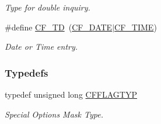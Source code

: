 \begin{DoxyCompactItemize}
\begin{DoxyCompactList}\small\item\em Type for double inquiry. \end{DoxyCompactList}\item 
\hypertarget{group__special__options__mask_ga8a50d7326b057d262f53ef84a166f9c5}{\#define \hyperlink{group__special__options__mask_ga8a50d7326b057d262f53ef84a166f9c5}{C\-F\-\_\-\-T\-D}~(\hyperlink{group__special__options__mask_ga1c5b511a34d2c0db6631539ba81a4386}{C\-F\-\_\-\-D\-A\-T\-E}$|$\hyperlink{group__special__options__mask_ga0fde537a92deb77f75b21c9e8d306509}{C\-F\-\_\-\-T\-I\-M\-E})}\label{group__special__options__mask_ga8a50d7326b057d262f53ef84a166f9c5}

\begin{DoxyCompactList}\small\item\em Date or Time entry. \end{DoxyCompactList}\end{DoxyCompactItemize}
\subsubsection*{Typedefs}
\begin{DoxyCompactItemize}
\item 
\hypertarget{group__special__options__mask_ga4854f1596d5c6e0604a478fa9a2e23f0}{typedef unsigned long \hyperlink{group__special__options__mask_ga4854f1596d5c6e0604a478fa9a2e23f0}{C\-F\-F\-L\-A\-G\-T\-Y\-P}}\label{group__special__options__mask_ga4854f1596d5c6e0604a478fa9a2e23f0}

\begin{DoxyCompactList}\small\item\em Special Options Mask Type. \end{DoxyCompactList}\end{DoxyCompactItemize}


